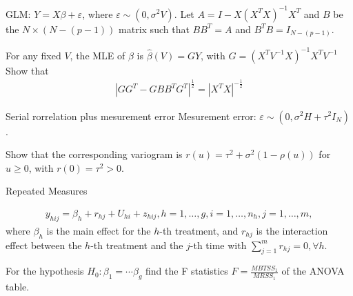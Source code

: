 \documentclass[UTF8,a4paper,10pt]{article}
\begin{document}
  \begin{Problem}[]{}

    GLM: \(Y = X\beta +\varepsilon \), where \(\varepsilon \sim(0,\sigma^2V)\).
    Let \(A = I-X(X^TX)^{-1}X^T\) and \(B\) be the \(N\times (N-(p-1))\) matrix such that \(BB^T = A\) and \(B^TB = I_{N-(p-1)}\).

    For any fixed \(V\), the MLE of \(\beta\) is \(\hat{\beta}(V) = GY\), with \(G = (X^TV^{-1}X)^{-1}X^TV^{-1}\)
    Show that
    \begin{equation*}
      \begin{aligned}
        |GG^T-GBB^TG^T|^{\frac{1}{2}} = |X^TX|^{-\frac{1}{2}}
      \end{aligned}
    \end{equation*}
    
      \end{Problem} 


          
  \begin{Problem}[]{Serial rorrelation plus mesurement error}
    Mesurement error: \(\varepsilon \sim (0,\sigma^2 H+\tau^2I_N)\).

    Show that the corresponding variogram is \(r(u) = \tau^2+\sigma^2(1-\rho(u))\) for \(u\geq 0\), with \(r(0) = \tau^2>0\).

    
      \end{Problem} 


  \begin{Problem}[]{Repeated Measures}

    \begin{equation*}
      \begin{aligned}
        y_{hij} = \beta_{h}+r_{hj}+ U_{hi}+z_{hij}, h = 1,\ldots,g, i=1,\ldots,n_h, j=1,\ldots,m,
      \end{aligned}
    \end{equation*}
    where \(\beta_h\) is the main effect for the \(h\)-th treatment, and \(r_{hj}\) is the interaction effect between the \(h\)-th treatment and the \(j\)-th time with \(\sum_{j=1}^{m}r_{hj} = 0 ,\forall h\).

    For the hypothesis \(H_0:\beta_1 = \cdots\beta_g\)
find the F statistics \(F = \frac{MBTSS_1}{MRSS_1}\) of the ANOVA table.

    
  \end{Problem} 

  
  \begin{solution}\,\\


  \end{solution}
    
\end{document}
